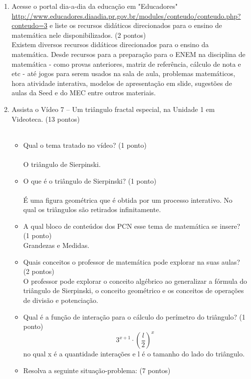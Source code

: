\documentclass[a4paper, 12pt]{article}
\begin{document}
\begin{enumerate}
\begin{enumerate}
    \item Acesse o portal dia-a-dia da educação  em  "Educadores"
      \url{http://www.educadores.diaadia.pr.gov.br/modules/conteudo/conteudo.php?conteudo=3}
      e liste os recursos didáticos direcionados para o ensino de matemática nele disponibilizados. (2 pontos) \\
      Existem diversos recursos didáticos direcionados para o ensino da matemática. Desde recursos para a preparação para o ENEM na disciplina de matemática - como provas anteriores, matriz de referência, cálculo de nota e etc - até jogos para serem usados na sala de aula, problemas matemáticos, hora atividade interativa, modelos de apresentação em slide, sugestões de aulas da Seed e do MEC entre outros materiais.
    \item Assista o Vídeo 7 – Um triângulo fractal especial, na Unidade 1 em Videoteca. (13 pontos) \\ \\
      \begin{itemize}
      \item Qual o tema tratado no vídeo? (1 ponto) \\ \\
        O triângulo de Sierpinski. \\
      \item O que é o triângulo de Sierpinski? (1 ponto) \\ \\
        É uma figura geométrica que é obtida por um processo interativo. No qual os triângulos são retirados infinitamente. \\
      \item A qual bloco de conteúdos dos PCN esse tema de matemática se insere? (1 ponto) \\
        Grandezas e Medidas.
      \item Quais conceitos o professor de matemática pode explorar na suas aulas? (2 pontos) \\
        O professor pode explorar o conceito algébrico ao generalizar a fórmula do triângulo de Sierpinski, o conceito geométrico e os conceitos de operações de divisão e potenciação. \\
      \item Qual é a função de interação para o cálculo do perímetro do triângulo? (1 ponto)
        $$3^{x+1}\cdot\left(\frac{l}{2}\right)^{x}$$ no qual x é a quantidade interações e l é o tamanho do lado do triângulo.
      \item Resolva a seguinte situação-problema: (7 pontos) \\ \\

\end{itemize}
\end{enumerate}
\end{enumerate}
\end{document}
